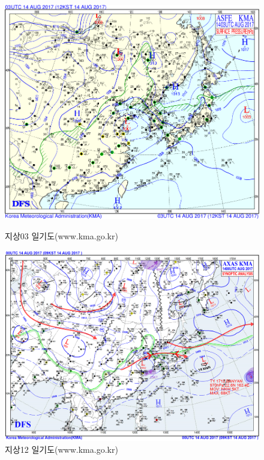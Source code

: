 \begin{figure}[p]\centering
	\begin{minipage}{0.97\textwidth}
	\includegraphics[width=0.97\linewidth]{22Weather_forecasting/images/sfc3_2017081403}
	\caption{지상03 일기도(www.kma.go.kr)}
\label{fig:draw-weathermapsurf03}
	\end{minipage}
	\begin{minipage}{0.97\textwidth}
	\includegraphics[width=0.97\linewidth]{22Weather_forecasting/images/surf_2017081400}
		\caption{지상12 일기도(www.kma.go.kr)}
		\label{fig:draw-weathermapsurf12}
	\end{minipage}
\end{figure}


